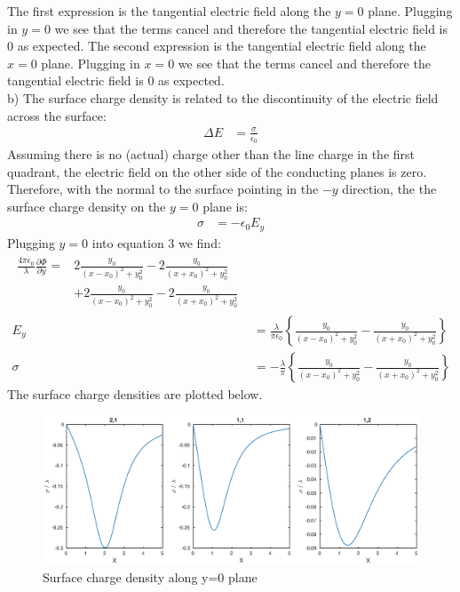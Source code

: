 \documentclass[a4paper,11pt]{article}
\numberwithin{equation}{section}
\newcommand{\ez}{\epsilon_0}
\newcommand{\lrb}[1]{\left\{{#1}\right\}}
\begin{document}
The first expression is the tangential electric field along the $y=0$ plane. 
Plugging in $y=0$ we see that the terms cancel and therefore the tangential electric field is 0 as expected.
The second expression is the tangential electric field along the $x=0$ plane. 
Plugging in $x=0$ we see that the terms cancel and therefore the tangential electric field is 0 as expected.
\\
b) The surface charge density is related to the discontinuity of the electric field across the surface:
\begin{align}
 \Delta E &= \frac{\sigma}{\ez}
\end{align}
Assuming there is no (actual) charge other than the line charge in the first quadrant, the electric field on the other side of the conducting planes is zero.
Therefore, with the normal to the surface pointing in the $-y$ direction, the the surface charge density on the $y=0$ plane is:
\begin{align}
 \sigma &= -\ez E_y
\end{align}
Plugging $y=0$ into equation 3 we find:
\begin{align}
 \begin{split}
 \frac{4\pi\ez}{\lambda}\frac{\partial \Phi}{\partial y} = &2\frac{y_0}{(x-x_0)^2+y_0^2}
      -2\frac{y_0}{(x+x_0)^2+y_0^2}\\
      &+2\frac{y_0}{(x-x_0)^2+y_0^2}
      -2\frac{y_0}{(x+x_0)^2+y_0^2}
 \end{split}\\
 E_y &= \frac{\lambda}{\pi\ez}\lrb{\frac{y_0}{(x-x_0)^2+y_0^2}-\frac{y_0}{(x+x_0)^2+y_0^2}}\\
 \sigma &= -\frac{\lambda}{\pi}\lrb{\frac{y_0}{(x-x_0)^2+y_0^2}-\frac{y_0}{(x+x_0)^2+y_0^2}}
\end{align}
The surface charge densities are plotted below.\\
\begin{figure}[h]
 \caption{Surface charge density along y=0 plane}
 \centering
   \includegraphics[width=\textwidth]{p2_3}
\end{figure}
\end{document}

